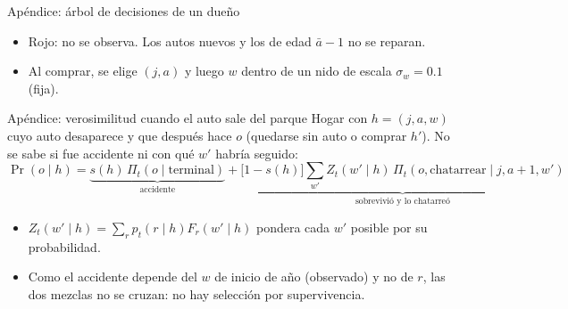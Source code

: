 \documentclass[aspectratio=169,11pt]{beamer}
\begin{document}
\begin{frame}{Apéndice: árbol de decisiones de un dueño}
  \centering
  \begin{itemize}\small
    \item Rojo: no se observa. Los autos nuevos y los de edad $\bar a-1$ no se reparan.
    \item Al comprar, se elige $(j,a)$ y luego $w$ dentro de un nido de escala
          $\sigma_w=0.1$ (fija).
  \end{itemize}
\end{frame}

\begin{frame}{Apéndice: verosimilitud cuando el auto sale del parque}
  Hogar con $h=(j,a,w)$ cuyo auto desaparece y que después hace $o$ (quedarse sin auto o
  comprar $h'$). No se sabe si fue accidente ni con qué $w'$ habría seguido:
  \[
    \Pr(o\mid h) = \underbrace{s(h)\,\Pi_t(o\mid \text{terminal})}_{\text{accidente}}
      + \underbrace{\big[1-s(h)\big]\sum_{w'} Z_t(w'\mid h)\,
        \Pi_t(o,\text{chatarrear}\mid j,a+1,w')}_{\text{sobrevivió y lo chatarreó}}
  \]
  \begin{itemize}\small
    \item $Z_t(w'\mid h)=\sum_r p_t(r\mid h)F_r(w'\mid h)$ pondera cada $w'$ posible por su
          probabilidad.
    \item Como el accidente depende del $w$ de inicio de año (observado) y no de $r$, las
          dos mezclas no se cruzan: no hay selección por supervivencia.
  \end{itemize}
\end{frame}
\end{document}
